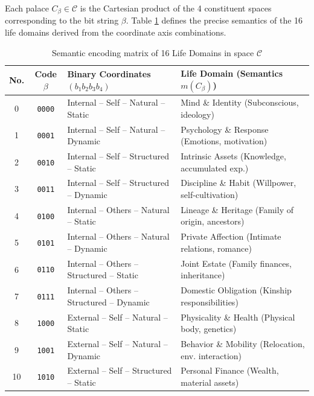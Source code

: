 \documentclass[a4paper,14pt, twoside]{memoir}
\begin{document}
Each palace $C_\beta \in \mathcal{C}$ is the Cartesian product of the 4 constituent spaces corresponding to the bit string $\beta$. Table \ref{tab:16_linh_vuc} defines the precise semantics of the 16 life domains derived from the coordinate axis combinations.

\begin{table}[htbp]
	\centering
	\caption{Semantic encoding matrix of 16 Life Domains in space $\mathcal{C}$}
	\label{tab:16_linh_vuc}
	\small
	\begin{tabular}{ccll}
		\toprule
		\textbf{No.} & \textbf{Code $\beta$} & \textbf{Binary Coordinates $(b_1b_2b_3b_4)$} & \textbf{Life Domain (Semantics $m(C_\beta)$)}     \\
		\midrule
		0            & \texttt{0000}       & Internal -- Self -- Natural -- Static       & Mind \& Identity (Subconscious, ideology)        \\
		1            & \texttt{0001}       & Internal -- Self -- Natural -- Dynamic      & Psychology \& Response (Emotions, motivation)    \\
		2            & \texttt{0010}       & Internal -- Self -- Structured -- Static    & Intrinsic Assets (Knowledge, accumulated exp.)   \\
		3            & \texttt{0011}       & Internal -- Self -- Structured -- Dynamic   & Discipline \& Habit (Willpower, self-cultivation)\\
		4            & \texttt{0100}       & Internal -- Others -- Natural -- Static     & Lineage \& Heritage (Family of origin, ancestors)\\
		5            & \texttt{0101}       & Internal -- Others -- Natural -- Dynamic    & Private Affection (Intimate relations, romance)  \\
		6            & \texttt{0110}       & Internal -- Others -- Structured -- Static   & Joint Estate (Family finances, inheritance)      \\
		7            & \texttt{0111}       & Internal -- Others -- Structured -- Dynamic  & Domestic Obligation (Kinship responsibilities)   \\
		8            & \texttt{1000}       & External -- Self -- Natural -- Static       & Physicality \& Health (Physical body, genetics)  \\
		9            & \texttt{1001}       & External -- Self -- Natural -- Dynamic      & Behavior \& Mobility (Relocation, env. interaction) \\
		10           & \texttt{1010}       & External -- Self -- Structured -- Static    & Personal Finance (Wealth, material assets)       \\

\end{tabular}
\end{table}
\end{document}
